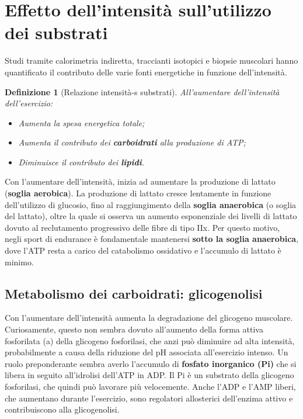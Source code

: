 \documentclass[12pt,a4paper]{report}
\newtheorem{definizione}{Definizione}[section]
\begin{document}
\section{Effetto dell'intensità sull'utilizzo dei substrati}
Studi tramite calorimetria indiretta, traccianti isotopici e biopsie muscolari hanno quantificato il contributo delle varie fonti energetiche in funzione dell'intensità.
\begin{definizione}[Relazione intensità-s substrati]
All'aumentare dell'intensità dell'esercizio:
\begin{itemize}
\item Aumenta la spesa energetica totale;
\item Aumenta il contributo dei \textbf{carboidrati} alla produzione di ATP;
\item Diminuisce il contributo dei \textbf{lipidi}.
\end{itemize}
\end{definizione}
Con l'aumentare dell'intensità, inizia ad aumentare la produzione di lattato (\textbf{soglia aerobica}). La produzione di lattato cresce lentamente in funzione dell'utilizzo di glucosio, fino al raggiungimento della \textbf{soglia anaerobica} (o soglia del lattato), oltre la quale si osserva un aumento esponenziale dei livelli di lattato dovuto al reclutamento progressivo delle fibre di tipo IIx.
Per questo motivo, negli sport di endurance è fondamentale mantenersi \textbf{sotto la soglia anaerobica}, dove l'ATP resta a carico del catabolismo ossidativo e l'accumulo di lattato è minimo.
\subsection{Metabolismo dei carboidrati: glicogenolisi}
Con l'aumentare dell'intensità aumenta la degradazione del glicogeno muscolare. Curiosamente, questo non sembra dovuto all'aumento della forma attiva fosforilata (a) della glicogeno fosforilasi, che anzi può diminuire ad alta intensità, probabilmente a causa della riduzione del pH associata all'esercizio intenso.
Un ruolo preponderante sembra averlo l'accumulo di \textbf{fosfato inorganico (Pi)} che si libera in seguito all'idrolisi dell'ATP in ADP. Il Pi è un substrato della glicogeno fosforilasi, che quindi può lavorare più velocemente. Anche l'ADP e l'AMP liberi, che aumentano durante l'esercizio, sono regolatori allosterici dell'enzima attivo e contribuiscono alla glicogenolisi.
\end{document}
